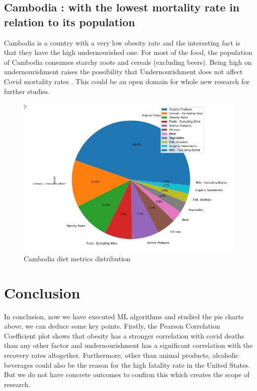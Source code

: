 \documentclass[journal,twoside,web]{ieeecolor}
\begin{document}
\subsection{Cambodia : with the lowest mortality rate in relation to its population}
Cambodia is a country with a very low obesity rate and the interesting fact is that they have the high undernourished one. For most of the food, the population of Cambodia consumes starchy roots and cereals (excluding beers). Being high on undernourishment raises the possibility that Undernourishment does not affect Covid mortality rates \cite{neak2021cambodia}. This could be an open domain for whole new research for further studies.

\begin{figure}[!t]
\centerline{\includegraphics[width=\columnwidth]{profig10.png}}
\caption{Cambodia diet metrics distribution}
\label{fig1}
\end{figure}

\section{Conclusion}
In conclusion, now we have executed ML algorithms and studied the pie charts above, we can deduce some key points. Firstly, the Pearson Correlation Coefficient plot shows that obesity has a stronger correlation with covid deaths than any other factor and undernourishment has a significant correlation with the recovery rates altogether. Furthermore, other than animal products, alcoholic beverages could also be the reason for the high fatality rate in the United States. But we do not have concrete outcomes to confirm this which creates the scope of research.
\end{document}
